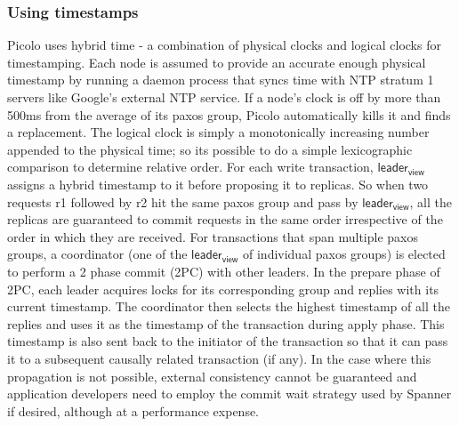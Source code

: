 \subsubsection{Using timestamps}
\textsf{Picolo} uses hybrid time \cite{hybrid_time} - a combination of physical clocks and logical clocks for timestamping. Each node is assumed to provide an accurate enough physical timestamp by running a daemon process that syncs time with NTP stratum 1 servers like Google's external NTP service. If a node's clock is off by more than 500ms from the average of its paxos group, \textsf{Picolo} automatically kills it and finds a replacement. The logical clock is simply a monotonically increasing number appended to the physical time; so its possible to do a simple lexicographic comparison to determine relative order. For each write transaction, $\textsf{leader}_\textsf{view}$ assigns a hybrid timestamp to it before proposing it to replicas. So when two requests r1 followed by r2 hit the same paxos group and pass by $\textsf{leader}_\textsf{view}$, all the replicas are guaranteed to commit requests in the same order irrespective of the order in which they are received. For transactions that span multiple paxos groups, a coordinator (one of the $\textsf{leader}_\textsf{view}$ of individual paxos groups) is elected to perform a \textsf{2 phase commit (2PC)} with other leaders. In the \textsf{prepare} phase of 2PC, each leader acquires locks for its corresponding group and replies with its current timestamp. The coordinator then selects the highest timestamp of all the replies and uses it as the timestamp of the transaction during \textsf{apply} phase. This timestamp is also sent back to the initiator of the transaction so that it can pass it to a subsequent causally related transaction (if any). In the case where this propagation is not possible, external consistency cannot be guaranteed and application developers need to employ the commit wait strategy used by Spanner if desired, although at a performance expense.
